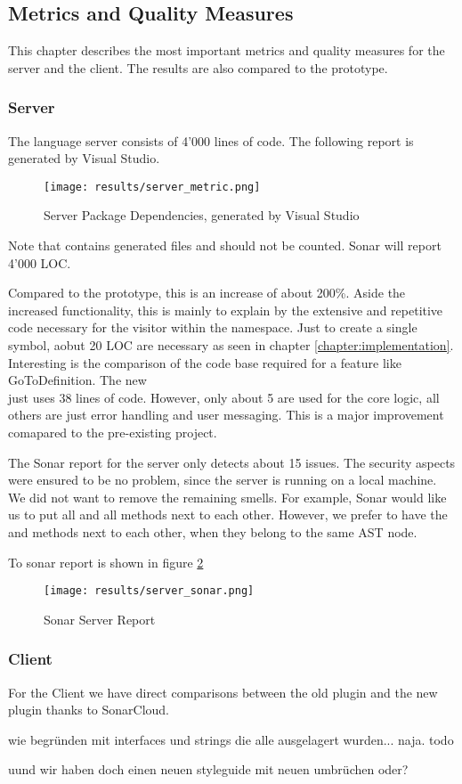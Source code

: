 \subsection{Metrics and Quality Measures}
\label{section:results:metrics}
This chapter describes the most important metrics and quality measures for the server and the client.
The results are also compared to the prototype.

\subsubsection{Server}
The language server consists of 4'000 lines of code. The following report is generated by Visual Studio.
\begin{figure}[H]
    \centering
    \texttt{[image: results/server\_metric.png]}
    \caption{Server Package Dependencies, generated by Visual Studio}
    \label{fig:dependency_graph}
\end{figure}
Note that  contains generated files and should not be counted.
Sonar will report 4'000 LOC.

Compared to the prototype, this is an increase of about 200\%.
Aside the increased functionality, this is mainly to explain by the extensive and repetitive code necessary for the visitor within the  namespace.
Just to create a single symbol, aobut 20 LOC are necessary as seen in chapter \ref{chapter:implementation}.\\

Interesting is the comparison of the code base required for a feature like GoToDefinition.
The new \\
 just uses 38 lines of code.
However, only about 5 are used for the core logic, all others are just error handling and user messaging.
This is a major improvement comapared to the pre-existing project.

The Sonar report for the server only detects about 15 issues.
The security aspects were ensured to be no problem, since the server is running on a local machine.
We did not want to remove the remaining smells.
For example, Sonar would like us to put all  and all  methods next to each other.
However, we prefer to have the  and  methods next to each other, when they belong to the same AST node.

To sonar report is shown in figure \ref{fig:sonarserver}

\begin{figure}[H]
    \centering
    \texttt{[image: results/server\_sonar.png]}
    \caption{Sonar Server Report}
    \label{fig:sonarserver}
\end{figure}


\subsubsection{Client}
For the Client we have direct comparisons between the old plugin and the new plugin thanks to SonarCloud.

wie begründen mit interfaces und strings die alle ausgelagert wurden... naja.
todo

uund wir haben doch einen neuen styleguide mit neuen umbrüchen oder?
